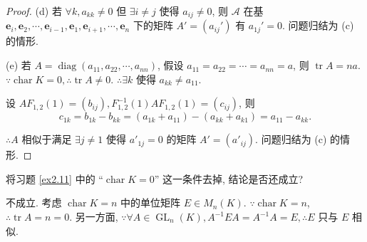 \documentclass{ctexart}
\begin{document}
\begin{proof}
    (d) 若 $\forall k,a_{kk}\neq0$ 但 $\exists i\neq j$ 使得 $a_{ij}\neq0$, 则 $\mathcal{A}$ 在基 $\boldsymbol{e}_i,\boldsymbol{e}_2,\cdots,\boldsymbol{e}_{i-1},\boldsymbol{e}_1,\boldsymbol{e}_{i+1},\cdots,\boldsymbol{e}_n$ 下的矩阵 $A'=(a_{ij}')$ 有 $a_{1j}'=0$. 问题归结为 (c) 的情形.

    (e) 若 $A=\operatorname{diag}(a_{11},a_{22},\cdots,a_{nn})$, 假设 $a_{11}=a_{22}=\cdots=a_{nn}=a$, 则 $\operatorname{tr}A=na$. $\because\operatorname{char}K=0,\therefore\operatorname{tr}A\neq0$. $\therefore\exists k$ 使得 $a_{kk}\neq a_{11}$.

    设 $AF_{1,2}(1)=(b_{ij}),F^{-1}_{1,2}(1)AF_{1,2}(1)=(c_{ij})$, 则
    \[c_{1k}=b_{1k}-b_{kk}=(a_{1k}+a_{11})-(a_{kk}+a_{k1})=a_{11}-a_{kk}.\]
    
    $\therefore A$ 相似于满足 $\exists j\neq 1$ 使得 $a'_{1j}=0$ 的矩阵 $A'=(a'_{ij})$. 问题归结为 (c) 的情形.
\end{proof}
\begin{exercise}%
    将习题 \ref{ex2.11} 中的 ``$\operatorname{char}K=0$'' 这一条件去掉, 结论是否还成立?
\end{exercise}
\begin{solution}
    不成立. 考虑 $\operatorname{char}K=n$ 中的单位矩阵 $E\in M_n(K)$. $\because\operatorname{char}K=n$, $\therefore\operatorname{tr}A=n=0$. 另一方面, $\because\forall A\in\operatorname{GL}_n(K),A^{-1}EA=A^{-1}A=E,\therefore E$ 只与 $E$ 相似.
\end{solution}
\end{document}
